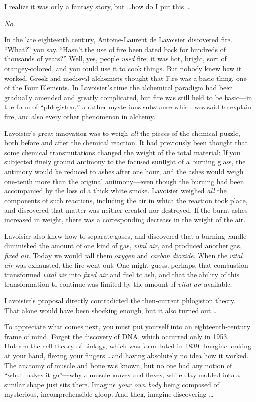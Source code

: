 {
 I realize it was only a fantasy story, but \ldots how do I put this
\ldots}

{
 \textit{No.}}

{
 In the late eighteenth century, Antoine-Laurent de Lavoisier
discovered fire. ``What?'' you say.
``Hasn't the use of fire been dated
back for hundreds of thousands of years?'' Well, yes,
people \textit{used} fire; it was hot, bright, sort of orangey-colored,
and you could use it to cook things. But nobody knew how it worked.
Greek and medieval alchemists thought that Fire was a basic thing, one
of the Four Elements. In Lavoisier's time the
alchemical paradigm had been gradually amended and greatly complicated,
but fire was still held to be basic---in the form of
``phlogiston,'' a rather mysterious
substance which was said to explain fire, and also every other
phenomenon in alchemy.}

{
 Lavoisier's great innovation was to weigh
\textit{all} the pieces of the chemical puzzle, both before and after
the chemical reaction. It had previously been thought that some
chemical transmutations changed the weight of the total material: If
you subjected finely ground antimony to the focused sunlight of a
burning glass, the antimony would be reduced to ashes after one hour,
and the ashes would weigh one-tenth more than the original
antimony---even though the burning had been accompanied by the loss of
a thick white smoke. Lavoisier weighed \textit{all} the components of
such reactions, including the air in which the reaction took place, and
discovered that matter was neither created nor destroyed. If the burnt
ashes increased in weight, there was a corresponding decrease in the
weight of the air.}

{
 Lavoisier also knew how to separate gases, and discovered that a
burning candle diminished the amount of one kind of gas, \textit{vital
air}, and produced another gas, \textit{fixed air}. Today we would call
them \textit{oxygen} and \textit{carbon dioxide}. When the
\textit{vital air} was exhausted, the fire went out. One might guess,
perhaps, that combustion transformed \textit{vital air} into
\textit{fixed air} and fuel to ash, and that the ability of this
transformation to continue was limited by the amount of \textit{vital
air} available.}

{
 Lavoisier's proposal directly contradicted the
then-current phlogiston theory. That alone would have been shocking
enough, but it also turned out \ldots}

{
 To appreciate what comes next, you must put yourself into an
eighteenth-century frame of mind. Forget the discovery of DNA, which
occurred only in 1953. Unlearn the cell theory of biology, which was
formulated in 1839. Imagine looking at your hand, flexing your fingers
\ldots and having absolutely no idea how it worked. The anatomy of
muscle and bone was known, but no one had any notion of
``what makes it go''---why a muscle
moves and flexes, while clay molded into a similar shape just sits
there. Imagine \textit{your own body} being composed of mysterious,
incomprehensible gloop. And then, imagine discovering \ldots}

